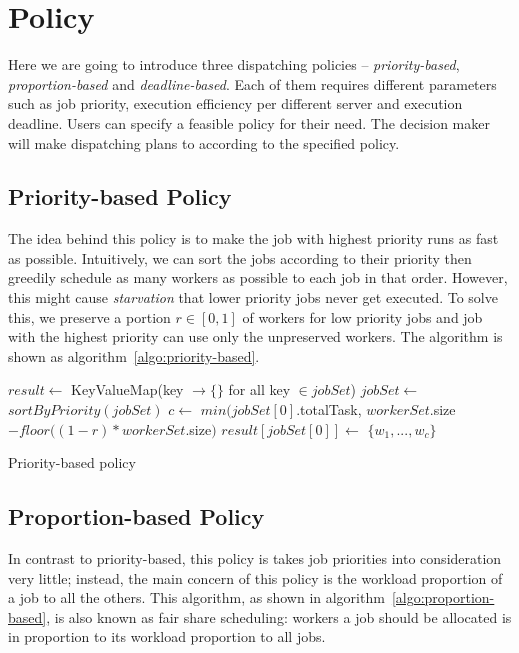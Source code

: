 \chapter{Policy}

Here we are going to introduce three dispatching policies --
\emph{priority-based}, \emph{proportion-based} and
\emph{deadline-based}.
Each of them requires different parameters such as job priority,
execution efficiency per different server and execution deadline.
Users can specify a feasible policy for their need.
The decision maker will make dispatching plans to according to the
specified policy.


\section{Priority-based Policy}

The idea behind this policy is to make the job with highest priority
runs as fast as possible.
Intuitively, we can sort the jobs according to their priority then
greedily schedule as many workers as possible to each job in that order.
However, this might cause \emph{starvation} that lower priority jobs
never get executed.
To solve this, we preserve a portion $r \in [0,1]$ of workers for low
priority jobs and job with the highest priority can use only the
unpreserved workers.
The algorithm is shown as algorithm~\ref{algo:priority-based}.

\begin{algorithm}[H]
  \DontPrintSemicolon %
  $result \gets$
  KeyValueMap(key $\to \{\}$ for all key $\in jobSet$)\;
  $jobSet \gets$ $sortByPriority(jobSet)$\;
  $c \gets$ $min(jobSet[0]$.totalTask, $workerSet$.size$-floor((1-r) *
      workerSet.$size$)$\;
  $result[jobSet[0]] \gets$ $\{w_1, ..., w_c\}$\;
  \;
  \caption{Priority-based policy}
  \label{algo:priority-based}
\end{algorithm}

\section{Proportion-based Policy}

In contrast to priority-based, this policy is takes job priorities into
consideration very little; instead, the main concern of this policy is
the workload proportion of a job to all the others.
This algorithm, as shown in algorithm~\ref{algo:proportion-based}, is
also known as fair share scheduling: workers a job should be allocated
is in proportion to its workload proportion to all jobs. 

